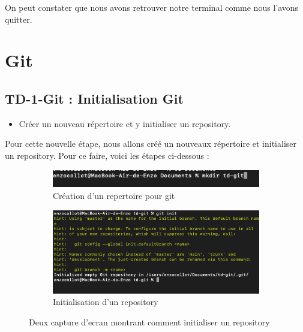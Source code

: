 \documentclass[12pt]{article}
\begin{document}
\vspace{0.3cm}

On peut constater que nous avons retrouver notre terminal comme nous l'avons quitter.




\newpage

\section{Git}

\subsection{TD-1-Git : Initialisation Git}

\vspace{0.3cm}

\begin{itemize}
  \item Créer un nouveau répertoire et y initialiser un repository.
\end{itemize}

Pour cette nouvelle étape, nous allons créé un nouveaux répertoire et initialiser un repository. Pour ce faire, voici les étapes ci-dessous : 

\vspace{0.3cm}

\begin{figure}[h]
  \centering
  \begin{subfigure}{0.30\textwidth}
    \centering
    \includegraphics[width=\textwidth]{Image-TD-Git-1/new-directory.png}
    \caption{Création d'un repertoire pour git}
  \end{subfigure}
  \vspace{0.9cm} %
  \begin{subfigure}{0.45\textwidth}
    \centering
    \includegraphics[width=\textwidth]{Image-TD-Git-1/git-init.png}
    \caption{Initialisation d'un repository}
  \end{subfigure}
  \caption{Deux capture d'ecran montrant comment initialiser un repository}
\end{figure}
\end{document}
